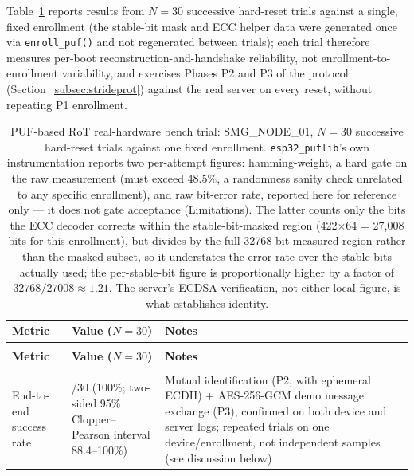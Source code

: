 \documentclass[preprint,12pt,authoryear]{elsarticle}
\begin{document}
Table~\ref{tab:pufbench} reports results from $N=30$ successive hard-reset trials against a single, fixed enrollment (the stable-bit mask and ECC helper data were generated once via \texttt{enroll\_puf()} and not regenerated between trials); each trial therefore measures per-boot reconstruction-and-handshake reliability, not enrollment-to-enrollment variability, and exercises Phases P2 and P3 of the protocol (Section~\ref{subsec:strideprot}) against the real server on every reset, without repeating P1 enrollment.

\begingroup
\small
\renewcommand{\arraystretch}{1.1}
\begin{longtable}{
    >{\raggedright\arraybackslash}p{4.6cm}
    >{\centering\arraybackslash}p{2.7cm}
    >{\raggedright\arraybackslash}p{4.9cm}
}
    \caption{PUF-based RoT real-hardware bench trial: SMG\_NODE\_01, $N=30$ successive hard-reset trials against one fixed enrollment. \texttt{esp32\_puflib}'s own instrumentation reports two per-attempt figures: hamming-weight, a hard gate on the raw measurement (must exceed 48.5\%, a randomness sanity check unrelated to any specific enrollment), and raw bit-error rate, reported here for reference only --- it does not gate acceptance (Limitations). The latter counts only the bits the ECC decoder corrects within the stable-bit-masked region (422$\times$64 = 27{,}008 bits for this enrollment), but divides by the full 32768-bit measured region rather than the masked subset, so it understates the error rate over the stable bits actually used; the per-stable-bit figure is proportionally higher by a factor of $32768/27008 \approx 1.21$. The server's ECDSA verification, not either local figure, is what establishes identity.}
    \label{tab:pufbench} \\
    \toprule
    \textbf{Metric} & \textbf{Value ($N=30$)} & \textbf{Notes} \\
    \midrule
    \endfirsthead
    \multicolumn{3}{l}{\small\textit{Table~\ref{tab:pufbench} continued from previous page}} \\
    \toprule
    \textbf{Metric} & \textbf{Value ($N=30$)} & \textbf{Notes} \\
    \midrule
    \endhead
    \midrule
    \multicolumn{3}{r}{\small\textit{continued on next page}} \\
    \endfoot
    \bottomrule
    \endlastfoot
        End-to-end success rate & 30/30 (100\%; two-sided 95\% Clopper--Pearson interval 88.4--100\%) & Mutual identification (P2, with ephemeral ECDH) + AES-256-GCM demo message exchange (P3), confirmed on both device and server logs; repeated trials on one device/enrollment, not independent samples (see discussion below) \\

\end{longtable}
\end{document}
